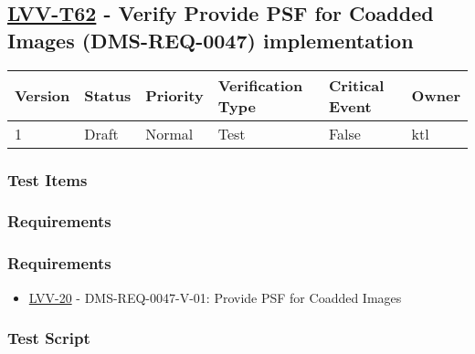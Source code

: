\hypertarget{lvv-t62---verify-provide-psf-for-coadded-images-dms-req-0047-implementation}{%
\subsection{\texorpdfstring{\href{https://jira.lsstcorp.org/secure/Tests.jspa\#/testCase/LVV-T62}{LVV-T62}
- Verify Provide PSF for Coadded Images (DMS-REQ-0047)
implementation}{LVV-T62 - Verify Provide PSF for Coadded Images (DMS-REQ-0047) implementation}}\label{lvv-t62---verify-provide-psf-for-coadded-images-dms-req-0047-implementation}}

\begin{longtable}[]{@{}llllll@{}}
\toprule
Version & Status & Priority & Verification Type & Critical Event &
Owner\tabularnewline
\midrule
\endhead
1 & Draft & Normal & Test & False & ktl\tabularnewline
\bottomrule
\end{longtable}

\hypertarget{test-items-28}{%
\subsubsection{Test Items}\label{test-items-28}}

\hypertarget{requirements-56}{%
\subsubsection{Requirements}\label{requirements-56}}

\hypertarget{requirements-57}{%
\subsubsection{Requirements}\label{requirements-57}}

\begin{itemize}
\tightlist
\item
  \href{https://jira.lsstcorp.org/browse/LVV-20}{LVV-20} -
  DMS-REQ-0047-V-01: Provide PSF for Coadded Images
\end{itemize}

\hypertarget{test-script-28}{%
\subsubsection{Test Script}\label{test-script-28}}

